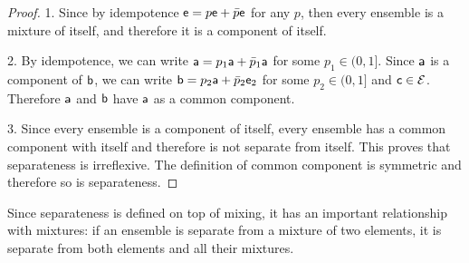 \begin{mathSection}
\begin{proof}
	1. Since by idempotence $\ens = p \ens + \bar{p} \ens$ for any $p$, then every ensemble is a mixture of itself, and therefore it is a component of itself.
	
	2. By idempotence, we can write $\ens[a] = p_1 \ens[a] + \bar{p}_1 \ens[a]$ for some $p_1 \in (0,1]$. Since $\ens[a]$ is a component of $\ens[b]$, we can write $\ens[b] = p_2 \ens[a] + \bar{p}_2 \ens[e]_2$ for some $p_2 \in (0, 1]$ and $\ens[c] \in \Ens$. Therefore $\ens[a]$ and $\ens[b]$ have $\ens[a]$ as a common component.
	
	3. Since every ensemble is a component of itself, every ensemble has a common component with itself and therefore is not separate from itself. This proves that separateness is irreflexive. The definition of common component is symmetric and therefore so is separateness.
\end{proof}
\end{mathSection}

Since separateness is defined on top of mixing, it has an important relationship with mixtures: if an ensemble is separate from a mixture of two elements, it is separate from both elements and all their mixtures.

